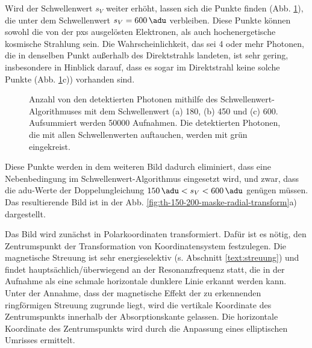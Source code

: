 \noindent
Wird der Schwellenwert $s_V$ weiter erhöht, lassen sich die Punkte finden (Abb. \ref{fig:th_180_450_600}), die unter dem Schwellenwert $s_V = \SI{600}{\adu}$ verbleiben. Diese Punkte können sowohl die von der \gls{pxs} ausgelösten Elektronen, als auch hochenergetische kosmische Strahlung sein. Die Wahrscheinlichkeit, das sei 4 oder mehr Photonen, die in denselben Punkt außerhalb des Direktstrahls landeten, ist sehr gering, insbesondere in Hinblick darauf, dass es sogar im Direktstrahl keine solche Punkte (Abb.  \ref{fig:th_180_450_600}c)) vorhanden sind.
%     
\begin{figure}[H]
    \centering
    
    \caption{Anzahl von den detektierten Photonen mithilfe des Schwellenwert-Algorithmuses mit dem Schwellenwert (a) \SI{180}{\adu}, (b) \SI{450}{\adu} und (c) \SI{600}{\adu}. Aufsummiert werden \num{50000} Aufnahmen. Die detektierten Photonen, die mit allen Schwellenwerten auftauchen, werden mit grün eingekreist. }
    \label{fig:th_180_450_600}
\end{figure}
\noindent
Diese Punkte werden in dem weiteren Bild dadurch eliminiert, dass eine Nebenbedingung im Schwellenwert-Algorithmus eingesetzt wird, und zwar, dass die \gls{adu}-Werte der Doppelungleichung $\SI{150}{\adu} < s_V < \SI{600}{\adu}$ genügen müssen. Das resultierende Bild ist in der Abb. \ref{fig:th-150-200-maske-radial-transform}a) dargestellt.

\noindent
Das Bild wird zunächst in Polarkoordinaten transformiert. Dafür ist es nötig, den Zentrumspunkt der Transformation von Koordinatensystem festzulegen. Die magnetische Streuung ist sehr energieselektiv (s. Abschnitt \ref{text:streuung}) und findet hauptsächlich/überwiegend an der Resonanzfrequenz statt, die in der Aufnahme als eine schmale horizontale dunklere Linie erkannt werden kann. Unter der Annahme, dass der magnetische Effekt der zu erkennenden ringförmigen Streuung zugrunde liegt, wird die vertikale Koordinate des Zentrumspunkts innerhalb der Absorptionskante gelassen. Die horizontale Koordinate des Zentrumspunkts wird durch die Anpassung eines elliptischen Umrisses ermittelt.

